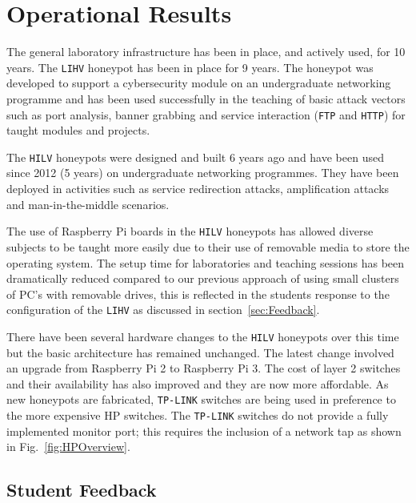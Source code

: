 \documentclass[10pt,journal]{IEEEtran}
\begin{document}
\section{Operational Results\label{sec:Results}}

The general laboratory infrastructure has been in place, and actively used, for
10 years. The \texttt{LIHV} honeypot has been in place for 9 years. The
honeypot was developed to support a cybersecurity module on an undergraduate
networking programme and has been used successfully in the teaching of basic
attack vectors such as port analysis, banner grabbing and service interaction
(\texttt{FTP} and \texttt{HTTP}) for taught modules and projects.

The \texttt{HILV} honeypots were designed and built 6 years ago and have been
used since 2012 (5 years) on undergraduate networking programmes. They have been
deployed in activities such as service redirection attacks, amplification
attacks and man-in-the-middle scenarios.

The use of Raspberry Pi boards in the \texttt{HILV} honeypots has allowed
diverse subjects to be taught more easily due to their use of removable media
to store the operating system. The setup time for laboratories and teaching
sessions has been dramatically reduced compared to our previous approach of
using small clusters of PC's with removable drives, this is reflected in the students response to the configuration of the \texttt{LIHV} as discussed in section~\ref{sec:Feedback}.

There have been several hardware changes to the \texttt{HILV} honeypots over
this time but the basic architecture has remained unchanged. The latest change
involved an upgrade from Raspberry Pi 2 to Raspberry Pi 3. The cost of layer 2
switches and their availability has also improved and they are now more
affordable. As new honeypots are fabricated, \texttt{TP-LINK} switches are being used in
preference to the more expensive HP switches. The \texttt{TP-LINK} switches do not
provide a fully implemented monitor port; this requires the inclusion of a
network tap as shown in Fig.~\ref{fig:HPOverview}.

\subsection{Student Feedback\label{sec:Feedback}}
\end{document}
